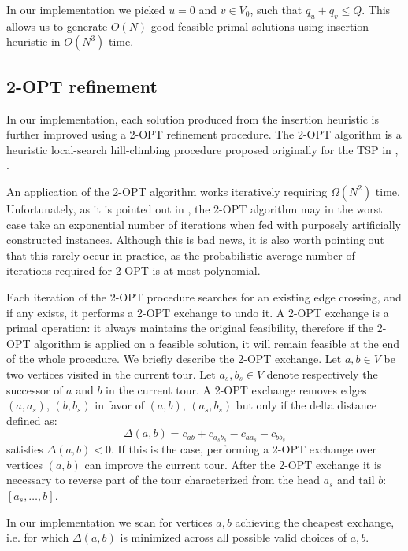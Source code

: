 In our implementation we picked $u = 0$ and $v \in V_0$, such that $q_u + q_v \le Q$.
This allows us to generate $O(N)$ good feasible primal solutions using insertion heuristic in $O(N^3)$ time.

\subsection{2-OPT refinement}
\label{sec:impl-2opt-refinement}

In our implementation, each solution produced from the insertion heuristic is further improved using a 2-OPT refinement procedure.
The 2-OPT algorithm is a heuristic local-search hill-climbing procedure proposed originally for the TSP in \cite{flood1956}, \cite{croes1958}.

An application of the 2-OPT algorithm works iteratively requiring $\Omega(N^2)$ time.
Unfortunately, as it is pointed out in \cite{chandra1999}, the 2-OPT algorithm may in the worst case take an exponential number of iterations when fed with purposely artificially constructed instances.
Although this is bad news, it is also worth pointing out that this rarely occur in practice, as the probabilistic average number of iterations required for 2-OPT is at most polynomial.

Each iteration of the 2-OPT procedure searches for an existing edge crossing, and if any exists, it performs a 2-OPT exchange to undo it.
A 2-OPT exchange is a primal operation: it always maintains the original feasibility, therefore if the 2-OPT algorithm is applied on a feasible solution, it will remain feasible at the end of the whole procedure.
We briefly describe the 2-OPT exchange.
Let $a, b \in V$ be two vertices visited in the current tour.
Let $a_s, b_s \in V$ denote respectively the successor of $a$ and $b$ in the current tour.
A 2-OPT exchange removes edges $(a, a_s)$, $(b, b_s)$ in favor of $(a, b)$, $(a_s, b_s)$ but only if the delta distance defined as:
\begin{equation}
	\Delta(a, b) = c_{ab} + c_{a_sb_s} - c_{aa_s} - c_{bb_s}
\end{equation}
satisfies $\Delta(a, b) < 0$.
If this is the case, performing a 2-OPT exchange over vertices $(a, b)$ can improve the current tour.
After the 2-OPT exchange it is necessary to reverse part of the tour characterized from the head $a_s$ and tail $b$: $[a_s, \dots, b]$.

In our implementation we scan for vertices $a, b$ achieving the cheapest exchange, i.e. for which $\Delta(a, b)$ is minimized across all possible valid choices of $a, b$.

